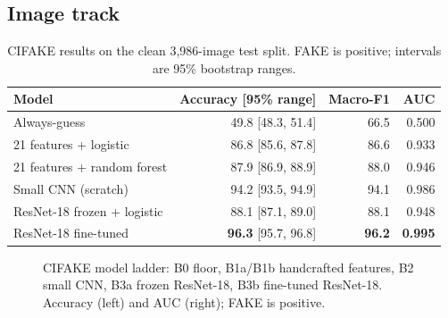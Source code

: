 \documentclass[11pt]{article}
\newcommand{\best}[1]{\textbf{#1}}
\begin{document}
\subsection{Image track}

\begin{table}[t]
\centering
\small
\caption{CIFAKE results on the clean 3{,}986-image test split. FAKE is positive; intervals are 95\% bootstrap ranges.}
\label{tab:image}
\begin{tabular}{@{}lrrr@{}}
\toprule
\textbf{Model} & \textbf{Accuracy [95\% range]} & \textbf{Macro-F1} & \textbf{AUC} \\
\midrule
Always-guess & 49.8 [48.3, 51.4] & 66.5 & 0.500 \\
21 features + logistic & 86.8 [85.6, 87.8] & 86.6 & 0.933 \\
21 features + random forest & 87.9 [86.9, 88.9] & 88.0 & 0.946 \\
Small CNN (scratch) & 94.2 [93.5, 94.9] & 94.1 & 0.986 \\
ResNet-18 frozen + logistic & 88.1 [87.1, 89.0] & 88.1 & 0.948 \\
ResNet-18 fine-tuned & \best{96.3} [95.7, 96.8] & \best{96.2} & \best{0.995} \\
\bottomrule
\end{tabular}
\end{table}


\begin{figure}[t]
\centering
\begin{minipage}{0.49\textwidth}\centering
{}
\end{minipage}\hfill
\begin{minipage}{0.49\textwidth}\centering
{}
\end{minipage}
\caption{CIFAKE model ladder: B0 floor, B1a/B1b handcrafted features, B2 small CNN, B3a frozen ResNet-18, B3b fine-tuned ResNet-18. Accuracy (left) and AUC (right); FAKE is positive.}
\label{fig:imgbars}
\end{figure}
\end{document}
